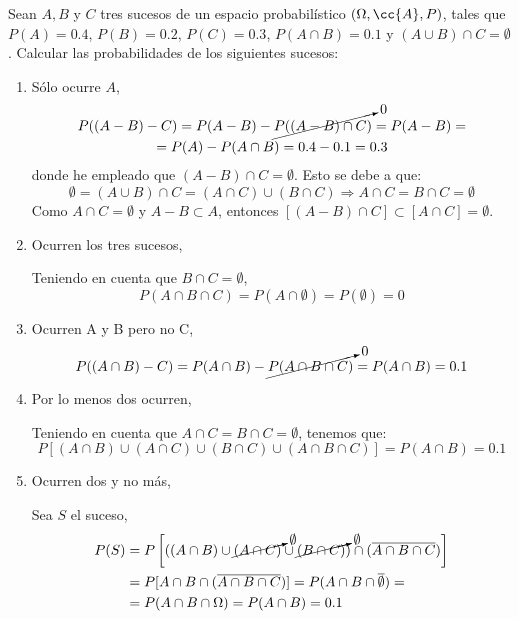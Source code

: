 \begin{ejercicio} \label{ej:3.Ejercicio2}
    Sean $A,B$ y $C$ tres sucesos de un espacio probabilístico $(\Omega,\cc{A}, P)$, tales que $P(A) = 0.4$, $P(B) = 0.2$, $P(C) = 0.3$, $P(A\cap B) = 0.1$ y $(A\cup B)\cap C = \emptyset$. Calcular las probabilidades de los siguientes sucesos:
    \begin{enumerate}
        \item Sólo ocurre $A$,
        \begin{multline*}
            P((A-B)-C)=P(A-B)-\cancelto{0}{P((A-B)\cap C)}=P(A-B)=\\=P(A)-P(A\cap B) = 0.4-0.1=0.3
        \end{multline*}
        donde he empleado que $(A-B)\cap C = \emptyset$. Esto se debe a que:
        \begin{equation*}
            \emptyset = (A\cup B)\cap C = (A\cap C) \cup (B\cap C) \Longrightarrow A\cap C=B\cap C=\emptyset
        \end{equation*}
        Como $A\cap C=\emptyset$ y $A-B\subset A$, entonces $[(A-B)\cap C]\subset [A\cap C] = \emptyset$.
        
        \item Ocurren los tres sucesos,

        Teniendo en cuenta que $B\cap C=\emptyset$,
        \begin{equation*}
            P(A\cap B\cap C)=P(A\cap \emptyset)=P(\emptyset)=0
        \end{equation*}
        
        \item Ocurren A y B pero no C,
        \begin{equation*}
        P((A\cap B)-C)=P(A\cap B)-\cancelto{0}{P(A\cap B \cap C)} = P(A\cap B)     = 0.1
        \end{equation*}
        
        \item Por lo menos dos ocurren,
        
        Teniendo en cuenta que $A\cap C = B\cap C = \emptyset$, tenemos que:
        \begin{equation*}
            P[(A\cap B) \cup (A\cap C) \cup (B\cap C) \cup (A\cap B\cap C)] = P(A\cap B) = 0.1 
        \end{equation*}
        
        \item Ocurren dos y no más,
        
        Sea $S$ el suceso,
        \begin{equation*}\begin{split}
            P(S)&= P\left[((A\cap B) \cup \cancelto{\emptyset}{(A\cap C)} \cup \cancelto{\emptyset}{(B\cap C)}) \cap (\overline{A\cap B \cap C})\right] \\
            &= P[A\cap B \cap (\overline{A\cap B \cap C})] = P(A\cap B \cap \overline{\emptyset}) =\\
            &= P(A\cap B \cap \Omega) = P(A\cap B) = 0.1
        \end{split}\end{equation*}
        

\end{enumerate}
\end{ejercicio}
